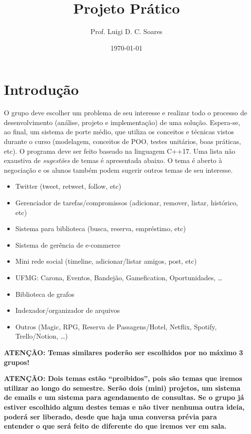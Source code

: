 \documentclass[11pt]{article}
\author{Prof. Luigi D. C. Soares}
\date{\today}
\title{Projeto Prático}
\begin{document}
\begin{center}
    \Large\bfseries\thetitle{}
\end{center}

\section{Introdução}
\label{sec:orgb3cfb87}

O grupo deve escolher um problema de seu interesse e realizar todo o
processo de desenvolvimento (análise, projeto e implementação) de uma
solução. Espera-se, ao final, um sistema de porte médio, que utiliza
os conceitos e técnicas vistos durante o curso (modelagem, conceitos
de POO, testes unitários, boas práticas, etc). O programa deve ser
feito baseado na linguagem C++17. Uma lista não exaustiva de \emph{sugestões}
de temas é apresentada abaixo. O tema é aberto à negociação e os
alunos também podem sugerir outros temas de seu interesse.

\begin{itemize}
\item Twitter (tweet, retweet, follow, etc)
\item Gerenciador de tarefas/compromissos (adicionar, remover, listar, histórico, etc)
\item Sistema para biblioteca (busca, reserva, empréstimo, etc)
\item Sistema de gerência de e-commerce
\item Mini rede social (timeline, adicionar/listar amigos, post, etc)
\item UFMG: Carona, Eventos, Bandejão, Gamefication, Oportunidades, \ldots{}
\item Biblioteca de grafos
\item Indexador/organizador de arquivos
\item Outros (Magic, RPG, Reserva de Passagens/Hotel, Netflix, Spotify, Trello/Notion, \ldots{})
\end{itemize}

\textbf{ATENÇÃO: Temas similares poderão ser escolhidos por no máximo 3 grupos!}

\textbf{ATENÇÃO: Dois temas estão ``proibidos'', pois são temas que iremos}
\textbf{utilizar ao longo do semestre. Serão dois (mini) projetos, um sistema}
\textbf{de emails e um sistema para agendamento de consultas. Se o grupo já}
\textbf{estiver escolhido algum destes temas e não tiver nenhuma outra ideia,}
\textbf{poderá ser liberado, desde que haja uma conversa prévia para entender}
\textbf{o que será feito de diferente do que iremos ver em sala.}
\end{document}
